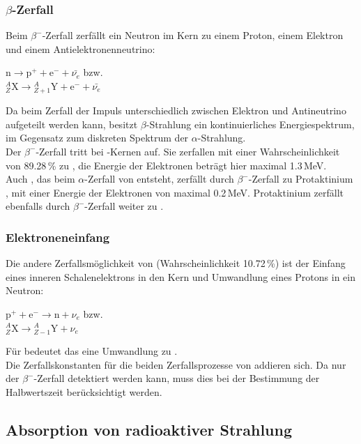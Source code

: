 \subsubsection{$\beta$-Zerfall}
Beim $\beta^-$-Zerfall zerfällt ein Neutron im Kern zu einem Proton, einem Elektron und einem
Antielektronenneutrino:
\begin{center}
$\text{n} \rightarrow \text{p}^+ + \text{e}^- +\bar{\nu_e}$ bzw.\\[0.15cm]
${}^{A}_{Z}\text{X} \rightarrow {}^{A}_{Z+1}\text{Y} + \text{e}^- + \bar{\nu_e}$
\end{center}
Da beim Zerfall der Impuls unterschiedlich zwischen Elektron und Antineutrino aufgeteilt werden kann,
besitzt $\beta$-Strahlung ein kontinuierliches Energiespektrum, im Gegensatz zum diskreten Spektrum
der $\alpha$-Strahlung.\\
Der $\beta^-$-Zerfall tritt bei -Kernen auf.
Sie zerfallen mit einer Wahrscheinlichkeit von 89.28\,\% zu ,
die Energie der Elektronen beträgt hier maximal 1.3\,MeV.\\
Auch , das beim $\alpha$-Zerfall von  entsteht,
zerfällt durch $\beta^-$-Zerfall zu Protaktinium ,
mit einer Energie der Elektronen von maximal 0.2\,MeV.
Protaktinium zerfällt ebenfalls durch $\beta^-$-Zerfall weiter zu .

\subsubsection{Elektroneneinfang}
Die andere Zerfallsmöglichkeit von  (Wahrscheinlichkeit 10.72\,\%)
ist der Einfang eines inneren Schalenelektrons
in den Kern und Umwandlung eines Protons in ein Neutron:
\begin{center}
$\text{p}^+ + \text{e}^- \rightarrow \text{n} + \nu_e$ bzw.\\[0.15cm]
${}^{A}_{Z}\text{X} \rightarrow {}^{A}_{Z-1}\text{Y} + \nu_e$
\end{center}
Für  bedeutet das eine Umwandlung zu .\\
Die Zerfallskonstanten für die beiden Zerfallsprozesse von  addieren sich.
Da nur der $\beta^-$-Zerfall detektiert werden kann, muss dies bei der Bestimmung der
Halbwertszeit berücksichtigt werden.

\subsection{Absorption von radioaktiver Strahlung}
